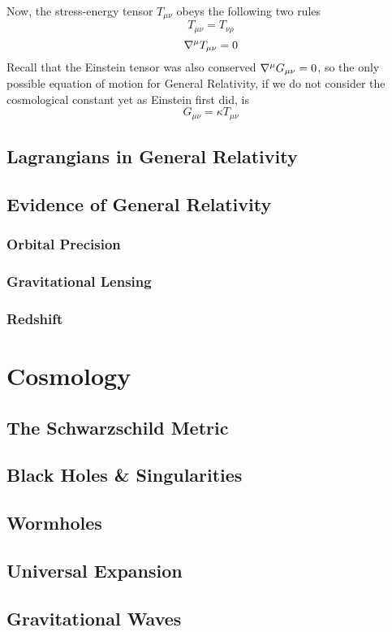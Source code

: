 \documentclass{article}
\begin{document}
 		Now, the stress-energy tensor $T_{\mu\nu}$ obeys the following two rules
 		\begin{equation}
 			\label{eq:SET-1}
 			T_{\mu\nu} = T_{\nu\rho}
 		\end{equation}
 		\begin{equation}
 			\label{eq:SET-2}
 			\nabla^\mu T_{\mu\nu} = 0
 		\end{equation}
 		Recall that the Einstein tensor was also conserved $\nabla^\mu G_{\mu\nu} = 0$, so the only possible equation of motion for General Relativity, if we do not consider the cosmological constant yet as Einstein first did, is
 		\begin{equation}
 			\label{eq:EFE-wrong}
 			\boxed{G_{\mu\nu} = \kappa T_{\mu\nu}}
 		\end{equation}
 		
 	\subsection{Lagrangians in General Relativity}
 	\subsection{Evidence of General Relativity}
 	\subsubsection{Orbital Precision}
 	\subsubsection{Gravitational Lensing}
 	\subsubsection{Redshift}
 	\section{Cosmology}
 	\subsection{The Schwarzschild Metric}
 	\subsection{Black Holes \& Singularities}
 	\subsection{Wormholes}
 	\subsection{Universal Expansion}
 	\subsection{Gravitational Waves}
 	
\end{document}
